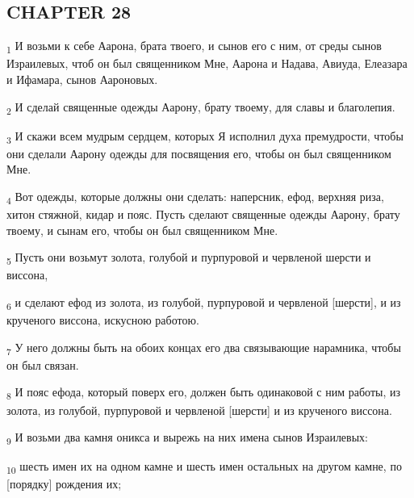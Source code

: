 \subsection{CHAPTER 28}
\begin{tcolorbox}
\textsubscript{1} И возьми к себе Аарона, брата твоего, и сынов его с ним, от среды сынов Израилевых, чтоб он был священником Мне, Аарона и Надава, Авиуда, Елеазара и Ифамара, сынов Аароновых.
\end{tcolorbox}
\begin{tcolorbox}
\textsubscript{2} И сделай священные одежды Аарону, брату твоему, для славы и благолепия.
\end{tcolorbox}
\begin{tcolorbox}
\textsubscript{3} И скажи всем мудрым сердцем, которых Я исполнил духа премудрости, чтобы они сделали Аарону одежды для посвящения его, чтобы он был священником Мне.
\end{tcolorbox}
\begin{tcolorbox}
\textsubscript{4} Вот одежды, которые должны они сделать: наперсник, ефод, верхняя риза, хитон стяжной, кидар и пояс. Пусть сделают священные одежды Аарону, брату твоему, и сынам его, чтобы он был священником Мне.
\end{tcolorbox}
\begin{tcolorbox}
\textsubscript{5} Пусть они возьмут золота, голубой и пурпуровой и червленой шерсти и виссона,
\end{tcolorbox}
\begin{tcolorbox}
\textsubscript{6} и сделают ефод из золота, из голубой, пурпуровой и червленой [шерсти], и из крученого виссона, искусною работою.
\end{tcolorbox}
\begin{tcolorbox}
\textsubscript{7} У него должны быть на обоих концах его два связывающие нарамника, чтобы он был связан.
\end{tcolorbox}
\begin{tcolorbox}
\textsubscript{8} И пояс ефода, который поверх его, должен быть одинаковой с ним работы, из золота, из голубой, пурпуровой и червленой [шерсти] и из крученого виссона.
\end{tcolorbox}
\begin{tcolorbox}
\textsubscript{9} И возьми два камня оникса и вырежь на них имена сынов Израилевых:
\end{tcolorbox}
\begin{tcolorbox}
\textsubscript{10} шесть имен их на одном камне и шесть имен остальных на другом камне, по [порядку] рождения их;
\end{tcolorbox}
